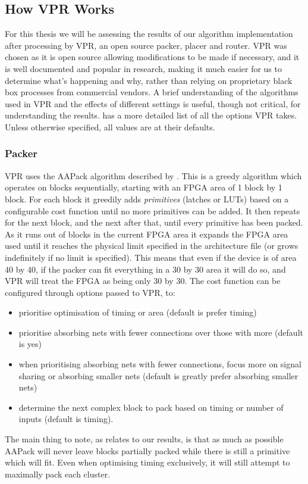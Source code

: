 \documentclass[12pt,final,oneside]{dwThesis} %
\begin{document}
   \subsection{How \acs{VPR} Works}\label{VPRSection}
   For this thesis we will be assessing the results of our algorithm implementation after processing by \ac{VPR}, an open source packer, placer and router. \ac{VPR} was chosen as it is open source allowing modifications to be made if necessary, and it is well documented and popular in research, making it much easier for us to determine what's happening and why, rather than relying on proprietary black box processes from commercial vendors.
   A brief understanding of the algorithms used in \ac{VPR} and the effects of different settings is useful, though not critical, for understanding the results. \cite{VPRManual} has a more detailed list of all the options \ac{VPR} takes. Unless otherwise specified, all values are at their defaults.
   \subsubsection{Packer}
   \ac{VPR} uses the AAPack algorithm described by \cite{AAPackThesis}. This is a greedy algorithm which operates on blocks sequentially, starting with an \ac{FPGA} area of 1 block by 1 block. For each block it greedily adds \textit{primitives} (latches or \acp{LUT}) based on a configurable cost function until no more primitives can be added. It then repeats for the next block, and the next after that, until every primitive has been packed. As it runs out of blocks in the current \ac{FPGA} area it expands the \ac{FPGA} area used until it reaches the physical limit specified in the architecture file (or grows indefinitely if no limit is specified). This means that even if the device is of area 40 by 40, if the packer can fit everything in a 30 by 30 area it will do so, and \ac{VPR} will treat the \ac{FPGA} as being only 30 by 30.
   The cost function can be configured through options passed to \ac{VPR}, to\cite{VPRManual}:
   \begin{itemize}
      \item prioritise optimisation of timing or area (default is prefer timing)
      \item prioritise absorbing nets with fewer connections over those with more (default is yes)
      \item when prioritising absorbing nets with fewer connections, focus more on signal sharing or absorbing smaller nets (default is greatly prefer absorbing smaller nets)
      \item determine the next complex block to pack based on timing or number of inputs (default is timing).
   \end{itemize}
   The main thing to note, as relates to our results, is that as much as possible AAPack will never leave blocks partially packed while there is still a primitive which will fit. Even when optimising timing exclusively, it will still attempt to maximally pack each cluster.
\end{document}
